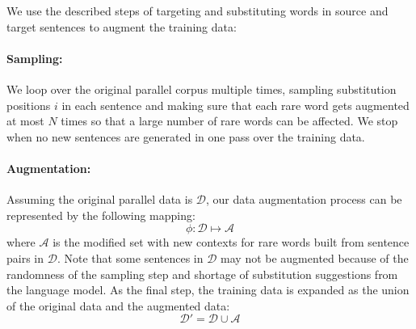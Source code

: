 \medskip

We use the described steps of targeting and substituting words in source and target sentences to augment the training data:

\paragraph{Sampling:}
We loop over the original parallel corpus multiple times, sampling substitution positions $i$ in each sentence and making sure that each rare word gets augmented at most $N$ times so that a large number of rare words can be affected.
We stop when no new sentences are generated in one pass over the training data.

\paragraph{Augmentation:}
Assuming the original parallel data is $\mathcal{D}$, our data augmentation process can be represented by the following mapping:
\begin{equation}
\phi:  \mathcal{D} \mapsto \mathcal{A}
\end{equation}
where $\mathcal{A}$ is the modified set with new contexts for rare words built from sentence pairs in $\mathcal{D}$. 
Note that some sentences in $\mathcal{D}$ may not be augmented because of the randomness of the sampling step and shortage of substitution suggestions from the language model.
As the final step, the training data is expanded as the union of the original data and the augmented data:
\begin{equation}
\mathcal{D'} = \mathcal{D} \cup \mathcal{A}
\end{equation}

\gap

